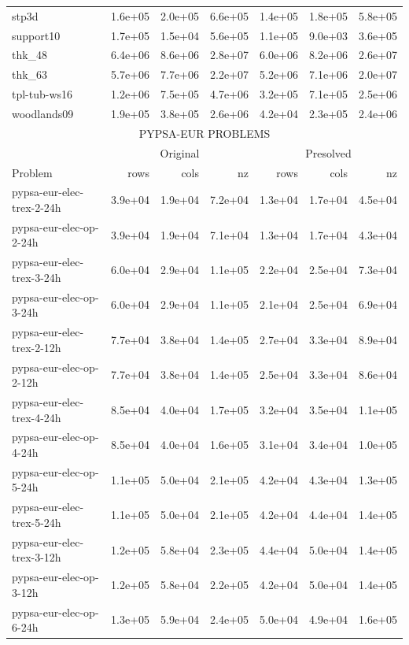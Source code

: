 \documentclass[a4paper]{article}
\newcommand{\0}{\mathbf 0}
\begin{document}
{\begin{longtable}{l|rrr|rrr}
stp3d & 1.6e+05 & 2.0e+05 & 6.6e+05 & 1.4e+05 & 1.8e+05 & 5.8e+05 \\
support10 & 1.7e+05 & 1.5e+04 & 5.6e+05 & 1.1e+05 & 9.0e+03 & 3.6e+05 \\
thk\_48 & 6.4e+06 & 8.6e+06 & 2.8e+07 & 6.0e+06 & 8.2e+06 & 2.6e+07 \\
thk\_63 & 5.7e+06 & 7.7e+06 & 2.2e+07 & 5.2e+06 & 7.1e+06 & 2.0e+07 \\
tpl-tub-ws16 & 1.2e+06 & 7.5e+05 & 4.7e+06 & 3.2e+05 & 7.1e+05 & 2.5e+06 \\
woodlands09 & 1.9e+05 & 3.8e+05 & 2.6e+06 & 4.2e+04 & 2.3e+05 & 2.4e+06 \\
\hline
\hline
\multicolumn{7}{c}{PYPSA-EUR PROBLEMS} \\
\hline
& \multicolumn{3}{c|}{Original} & \multicolumn{3}{c}{Presolved} \\
\hline
Problem & rows & cols & nz & rows & cols & nz \\
\hline
pypsa-eur-elec-trex-2-24h & 3.9e+04 & 1.9e+04 & 7.2e+04 & 1.3e+04 & 1.7e+04 & 4.5e+04 \\
pypsa-eur-elec-op-2-24h & 3.9e+04 & 1.9e+04 & 7.1e+04 & 1.3e+04 & 1.7e+04 & 4.3e+04 \\
pypsa-eur-elec-trex-3-24h & 6.0e+04 & 2.9e+04 & 1.1e+05 & 2.2e+04 & 2.5e+04 & 7.3e+04 \\
pypsa-eur-elec-op-3-24h & 6.0e+04 & 2.9e+04 & 1.1e+05 & 2.1e+04 & 2.5e+04 & 6.9e+04 \\
pypsa-eur-elec-trex-2-12h & 7.7e+04 & 3.8e+04 & 1.4e+05 & 2.7e+04 & 3.3e+04 & 8.9e+04 \\
pypsa-eur-elec-op-2-12h & 7.7e+04 & 3.8e+04 & 1.4e+05 & 2.5e+04 & 3.3e+04 & 8.6e+04 \\
pypsa-eur-elec-trex-4-24h & 8.5e+04 & 4.0e+04 & 1.7e+05 & 3.2e+04 & 3.5e+04 & 1.1e+05 \\
pypsa-eur-elec-op-4-24h & 8.5e+04 & 4.0e+04 & 1.6e+05 & 3.1e+04 & 3.4e+04 & 1.0e+05 \\
pypsa-eur-elec-op-5-24h & 1.1e+05 & 5.0e+04 & 2.1e+05 & 4.2e+04 & 4.3e+04 & 1.3e+05 \\
pypsa-eur-elec-trex-5-24h & 1.1e+05 & 5.0e+04 & 2.1e+05 & 4.2e+04 & 4.4e+04 & 1.4e+05 \\
pypsa-eur-elec-trex-3-12h & 1.2e+05 & 5.8e+04 & 2.3e+05 & 4.4e+04 & 5.0e+04 & 1.4e+05 \\
pypsa-eur-elec-op-3-12h & 1.2e+05 & 5.8e+04 & 2.2e+05 & 4.2e+04 & 5.0e+04 & 1.4e+05 \\
pypsa-eur-elec-op-6-24h & 1.3e+05 & 5.9e+04 & 2.4e+05 & 5.0e+04 & 4.9e+04 & 1.6e+05 \\

\end{longtable}}
\end{document}
